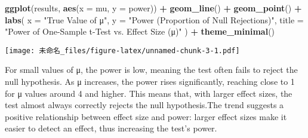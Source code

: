 \documentclass[
]{article}
\newenvironment{Shaded}{\begin{snugshade}}{\end{snugshade}}
\newcommand{\AttributeTok}[1]{\textcolor[rgb]{0.13,0.29,0.53}{#1}}
\newcommand{\FunctionTok}[1]{\textcolor[rgb]{0.13,0.29,0.53}{\textbf{#1}}}
\newcommand{\NormalTok}[1]{#1}
\newcommand{\SpecialCharTok}[1]{\textcolor[rgb]{0.81,0.36,0.00}{\textbf{#1}}}
\newcommand{\StringTok}[1]{\textcolor[rgb]{0.31,0.60,0.02}{#1}}
\begin{document}
\begin{Shaded}
\begin{Highlighting}[]
\FunctionTok{ggplot}\NormalTok{(results, }\FunctionTok{aes}\NormalTok{(}\AttributeTok{x =}\NormalTok{ mu, }\AttributeTok{y =}\NormalTok{ power)) }\SpecialCharTok{+}
  \FunctionTok{geom\_line}\NormalTok{() }\SpecialCharTok{+}
  \FunctionTok{geom\_point}\NormalTok{() }\SpecialCharTok{+}
  \FunctionTok{labs}\NormalTok{(}
    \AttributeTok{x =} \StringTok{"True Value of μ"}\NormalTok{,}
    \AttributeTok{y =} \StringTok{"Power (Proportion of Null Rejections)"}\NormalTok{,}
    \AttributeTok{title =} \StringTok{"Power of One{-}Sample t{-}Test vs. Effect Size (μ)"}
\NormalTok{  ) }\SpecialCharTok{+}
  \FunctionTok{theme\_minimal}\NormalTok{()}
\end{Highlighting}
\end{Shaded}

\texttt{[image: 未命名\_files/figure-latex/unnamed-chunk-3-1.pdf]}

For small values of μ, the power is low, meaning the test often fails to
reject the null hypothesis. As μ increases, the power rises
significantly, reaching close to 1 for μ values around 4 and higher.
This means that, with larger effect sizes, the test almost always
correctly rejects the null hypothesis.The trend suggests a positive
relationship between effect size and power: larger effect sizes make it
easier to detect an effect, thus increasing the test's power.
\end{document}
